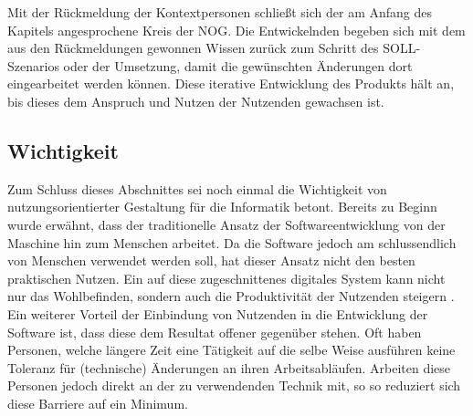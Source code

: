 Mit der Rückmeldung der Kontextpersonen schließt sich der am Anfang des Kapitels angesprochene Kreis der NOG.
Die Entwickelnden begeben sich mit dem aus den Rückmeldungen gewonnen Wissen zurück zum Schritt des SOLL-Szenarios oder der Umsetzung, damit die gewünschten Änderungen dort eingearbeitet werden können.
Diese iterative Entwicklung des Produkts hält an, bis dieses dem Anspruch und Nutzen der Nutzenden gewachsen ist.

\newpage
\subsection{Wichtigkeit}

Zum Schluss dieses Abschnittes sei noch einmal die Wichtigkeit von nutzungsorientierter Gestaltung für die Informatik betont.
Bereits zu Beginn wurde erwähnt, dass der traditionelle Ansatz der Softwareentwicklung von der Maschine hin zum Menschen arbeitet.
Da die Software jedoch am schlussendlich von Menschen verwendet werden soll, hat dieser Ansatz nicht den besten praktischen Nutzen.
Ein auf diese zugeschnittenes digitales System kann nicht nur das Wohlbefinden, sondern auch die Produktivität der Nutzenden steigern \cite{NOG}.
Ein weiterer Vorteil der Einbindung von Nutzenden in die Entwicklung der Software ist, dass diese dem Resultat offener gegenüber stehen.
Oft haben Personen, welche längere Zeit eine Tätigkeit auf die selbe Weise ausführen keine Toleranz für (technische) Änderungen an ihren Arbeitsabläufen.
Arbeiten diese Personen jedoch direkt an der zu verwendenden Technik mit, so so reduziert sich diese Barriere auf ein Minimum.
